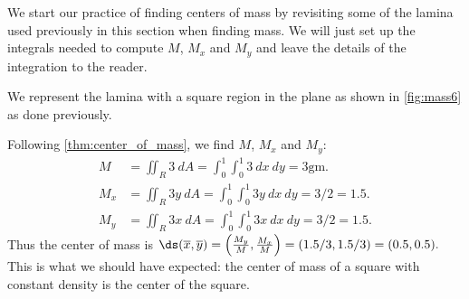 We start our practice of finding centers of mass by revisiting some of the lamina used previously in this section when finding mass. We will  just set up the integrals needed to compute $M$, $M_x$ and $M_y$ and leave the details of the integration to the reader.

{We represent the lamina with a square region in the plane as shown in \autoref{fig:mass6} as done previously. 

Following \autoref{thm:center_of_mass}, we find $M$, $M_x$ and $M_y$:
\begin{align*}
M &= \iint_R 3\ dA = \int_0^1\int_0^1 3\ dx\ dy =3\text{gm}.\\
M_x &= \iint_R 3y\ dA = \int_0^1\int_0^1 3y\ dx\ dy =3/2 = 1.5.\\
M_y &= \iint_R 3x\ dA = \int_0^1\int_0^1 3x\ dx\ dy =3/2 = 1.5.
\end{align*}
Thus the center of mass is $\ds (\overline{x},\overline{y}) = \left(\frac{M_y}M,\frac{M_x}M\right) = (1.5/3,1.5/3) = (0.5,0.5).$ This is what we should have expected: the center of mass of a square with constant density is the center of the square.}


